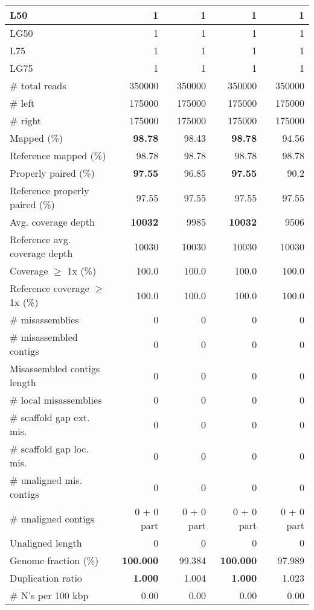 \documentclass[12pt,a4paper]{article}
\begin{document}
\begin{table}[ht]
\begin{center}
\begin{tabular}{|l*{4}{|r}|}
L50 & 1 & 1 & 1 & 1 \\ \hline
LG50 & 1 & 1 & 1 & 1 \\ \hline
L75 & 1 & 1 & 1 & 1 \\ \hline
LG75 & 1 & 1 & 1 & 1 \\ \hline
\# total reads & 350000 & 350000 & 350000 & 350000 \\ \hline
\# left & 175000 & 175000 & 175000 & 175000 \\ \hline
\# right & 175000 & 175000 & 175000 & 175000 \\ \hline
Mapped (\%) & {\bf 98.78} & 98.43 & {\bf 98.78} & 94.56 \\ \hline
Reference mapped (\%) & 98.78 & 98.78 & 98.78 & 98.78 \\ \hline
Properly paired (\%) & {\bf 97.55} & 96.85 & {\bf 97.55} & 90.2 \\ \hline
Reference properly paired (\%) & 97.55 & 97.55 & 97.55 & 97.55 \\ \hline
Avg. coverage depth & {\bf 10032} & 9985 & {\bf 10032} & 9506 \\ \hline
Reference avg. coverage depth & 10030 & 10030 & 10030 & 10030 \\ \hline
Coverage $\geq$ 1x (\%) & 100.0 & 100.0 & 100.0 & 100.0 \\ \hline
Reference coverage $\geq$ 1x (\%) & 100.0 & 100.0 & 100.0 & 100.0 \\ \hline
\# misassemblies & 0 & 0 & 0 & 0 \\ \hline
\# misassembled contigs & 0 & 0 & 0 & 0 \\ \hline
Misassembled contigs length & 0 & 0 & 0 & 0 \\ \hline
\# local misassemblies & 0 & 0 & 0 & 0 \\ \hline
\# scaffold gap ext. mis. & 0 & 0 & 0 & 0 \\ \hline
\# scaffold gap loc. mis. & 0 & 0 & 0 & 0 \\ \hline
\# unaligned mis. contigs & 0 & 0 & 0 & 0 \\ \hline
\# unaligned contigs & 0 + 0 part & 0 + 0 part & 0 + 0 part & 0 + 0 part \\ \hline
Unaligned length & 0 & 0 & 0 & 0 \\ \hline
Genome fraction (\%) & {\bf 100.000} & 99.384 & {\bf 100.000} & 97.989 \\ \hline
Duplication ratio & {\bf 1.000} & 1.004 & {\bf 1.000} & 1.023 \\ \hline
\# N's per 100 kbp & 0.00 & 0.00 & 0.00 & 0.00 \\ \hline

\end{tabular}
\end{center}
\end{table}
\end{document}
